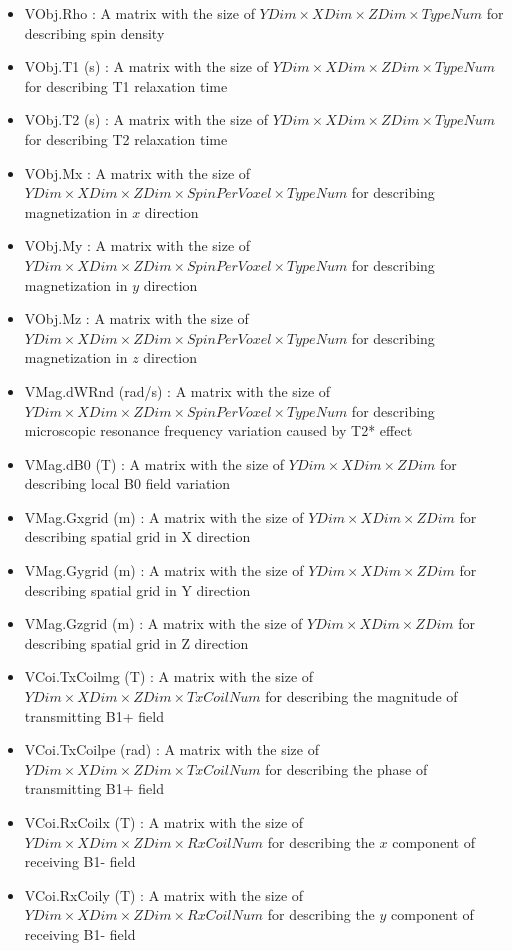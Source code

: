 \documentclass{book}%
\begin{document}
\begin{enumerate}
\begin{itemize}
	\item VObj.Rho : A matrix with the size of $ YDim \times XDim \times ZDim \times TypeNum $ for describing spin density
	\item VObj.T1 (s) : A matrix with the size of $ YDim \times XDim \times ZDim \times TypeNum $ for describing T1 relaxation time
	\item VObj.T2 (s) : A matrix with the size of $ YDim \times XDim \times ZDim \times TypeNum $ for describing T2 relaxation time
	\item VObj.Mx : A matrix with the size of $ YDim \times XDim \times ZDim \times SpinPerVoxel \times TypeNum $ for describing magnetization in $x$ direction
	\item VObj.My : A matrix with the size of $ YDim \times XDim \times ZDim \times SpinPerVoxel \times TypeNum $ for describing magnetization in $y$ direction
	\item VObj.Mz : A matrix with the size of $ YDim \times XDim \times ZDim \times SpinPerVoxel \times TypeNum $ for describing magnetization in $z$ direction
	\item VMag.dWRnd (rad/s) : A matrix with the size of $ YDim \times XDim \times ZDim \times SpinPerVoxel \times TypeNum $ for describing microscopic resonance frequency variation caused by T2* effect
	\item VMag.dB0 (T) : A matrix with the size of $ YDim \times XDim \times ZDim $ for describing local B0 field variation
	\item VMag.Gxgrid (m) : A matrix with the size of $ YDim \times XDim \times ZDim $ for describing spatial grid in X direction
	\item VMag.Gygrid (m) : A matrix with the size of $ YDim \times XDim \times ZDim $ for describing spatial grid in Y direction
	\item VMag.Gzgrid (m) : A matrix with the size of $ YDim \times XDim \times ZDim $ for describing spatial grid in Z direction
	\item VCoi.TxCoilmg (T) : A matrix with the size of $ YDim \times XDim \times ZDim \times TxCoilNum $ for describing the magnitude of transmitting B1+ field
	\item VCoi.TxCoilpe (rad) : A matrix with the size of $ YDim \times XDim \times ZDim \times TxCoilNum $ for describing the phase of transmitting B1+ field
	\item VCoi.RxCoilx (T) : A matrix with the size of $ YDim \times XDim \times ZDim \times RxCoilNum $ for describing the $x$ component of receiving B1- field
	\item VCoi.RxCoily (T) : A matrix with the size of $ YDim \times XDim \times ZDim \times RxCoilNum $ for describing the $y$ component of receiving B1- field
\end{itemize}


\end{enumerate}
\end{document}
